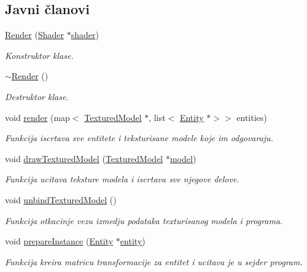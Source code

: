 \subsection*{Javni članovi}
\begin{DoxyCompactItemize}
\item 
\hyperlink{classcore_1_1Render_ab101784fcf9fdb1f8f86b026fd47c2f6}{Render} (\hyperlink{classshader_1_1Shader}{Shader} $\ast$\hyperlink{classcore_1_1Render_a220be4bb26b6cbec909953f247a7732c}{shader})
\begin{DoxyCompactList}\small\item\em Konstruktor klase. \end{DoxyCompactList}\item 
\hyperlink{classcore_1_1Render_ac11786f4406333b24a33b61c5e2506f4}{$\sim$\+Render} ()
\begin{DoxyCompactList}\small\item\em Destruktor klase. \end{DoxyCompactList}\item 
void \hyperlink{classcore_1_1Render_ab36887be4cb2f56e73b10f78e5d04d4a}{render} (map$<$ \hyperlink{classmodel_1_1TexturedModel}{Textured\+Model} $\ast$, list$<$ \hyperlink{classentity_1_1Entity}{Entity} $\ast$$>$$>$ entities)
\begin{DoxyCompactList}\small\item\em Funkcija iscrtava sve entitete i teksturisane modele koje im odgovaraju. \end{DoxyCompactList}\item 
void \hyperlink{classcore_1_1Render_aedd0d54abe302da59731759a5d456713}{draw\+Textured\+Model} (\hyperlink{classmodel_1_1TexturedModel}{Textured\+Model} $\ast$\hyperlink{namespacecore_aa1479d4ed4dadbfe085b26662122b68a}{model})
\begin{DoxyCompactList}\small\item\em Funkcija ucitava teksture modela i iscrtava sve njegove delove. \end{DoxyCompactList}\item 
void \hyperlink{classcore_1_1Render_adfa16af79f2e428b94ccbb406e77ef93}{unbind\+Textured\+Model} ()
\begin{DoxyCompactList}\small\item\em Funkcija otkacinje vezu izmedju podataka texturisanog modela i programa. \end{DoxyCompactList}\item 
void \hyperlink{classcore_1_1Render_aeb298077579c71d8b4407dacbed75302}{prepare\+Instance} (\hyperlink{classentity_1_1Entity}{Entity} $\ast$\hyperlink{namespacecore_aa710c0ea388433d2d80d1d1c67582eda}{entity})
\begin{DoxyCompactList}\small\item\em Funkcija kreira matricu transformacije za entitet i ucitava je u sejder program. \end{DoxyCompactList}\end{DoxyCompactItemize}
